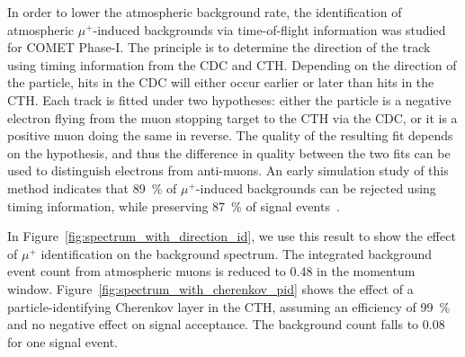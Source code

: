 In order to lower the atmospheric background rate, the identification of
atmospheric $\mu^+$-induced backgrounds via time-of-flight information was
studied for COMET Phase-I. The principle is to determine the direction of the
track using timing information from the CDC and CTH. Depending on the direction
of the particle, hits in the CDC will either occur earlier or later than hits in
the CTH. Each track is fitted under two hypotheses: either the particle is a
negative electron flying from the muon stopping target to the CTH via the CDC,
or it is a positive muon doing the same in reverse. The quality of the resulting
fit depends on the hypothesis, and thus the difference in quality between the
two fits can be used to distinguish electrons from anti-muons. An early
simulation study of this method indicates that \SI{89}{\percent} of
$\mu^+$-induced backgrounds can be rejected using timing information, while
preserving \SI{87}{\percent} of signal events~\cite{moritsu}. 

In Figure~\ref{fig:spectrum_with_direction_id}, we use this result to show the
effect of $\mu^+$ identification on the background spectrum. The integrated
background event count from atmospheric muons is reduced to 0.48 in the momentum
window. Figure~\ref{fig:spectrum_with_cherenkov_pid} shows the effect of a
particle-identifying Cherenkov layer in the CTH, assuming an efficiency of
\SI{99}{\percent} and no negative effect on signal acceptance. The background
count falls to 0.08 for one signal event.

